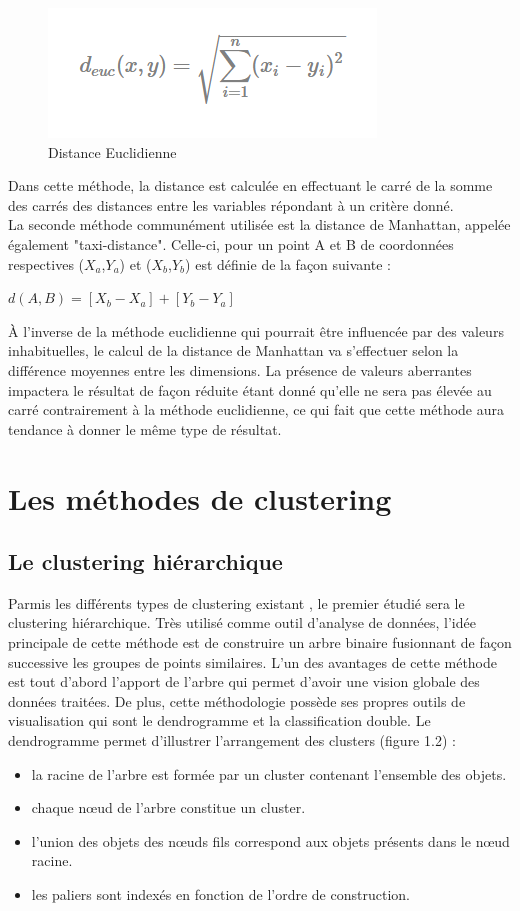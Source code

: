 \documentclass[memoire.tex]{subfiles}
\begin{document}
	\begin{figure}[h!]
		\centerline{\includegraphics[scale=0.8]{img/euclidienne_distance.png}}
		\caption{Distance Euclidienne}
	\end{figure}
Dans cette méthode, la distance est calculée en effectuant le carré de la somme des carrés des distances entre les variables répondant à un critère donné.\\
La seconde méthode communément utilisée est la distance de Manhattan, appelée également "taxi-distance". Celle-ci, pour un point A et B de coordonnées respectives ($X_{a}$,$Y_{a}$) et ($X_{b}$,$Y_{b}$) est définie de la façon  suivante :\\
\begin{center}
$d(A,B) = [X_{b} - X_{a}] + [Y_{b} - Y_{a}]$\\
\end{center}
À l'inverse de la méthode euclidienne qui pourrait être influencée par des valeurs inhabituelles, le calcul de la distance de Manhattan va s'effectuer selon la différence moyennes entre les dimensions. La présence de valeurs aberrantes impactera le résultat de façon réduite étant donné qu'elle ne sera pas élevée au carré contrairement à la méthode euclidienne, ce qui fait que cette méthode aura tendance à donner le même type de résultat.
\newpage
\section{Les méthodes de clustering}
		\subsection{Le clustering hiérarchique}
Parmis les différents types de clustering existant \cite{ref4}, le premier étudié sera le clustering hiérarchique. Très utilisé comme outil d'analyse de données, l'idée principale de cette méthode est de construire un arbre binaire fusionnant de façon successive les groupes de points similaires. L'un des avantages de cette méthode est tout d'abord l'apport de l'arbre qui permet d'avoir une vision globale des données traitées. De plus, cette méthodologie possède ses propres outils de visualisation qui sont le dendrogramme et la classification double. Le dendrogramme permet d'illustrer l'arrangement des clusters (figure 1.2)\cite{ref8} :
\begin{itemize}
\item la racine de l'arbre est formée par un cluster contenant l'ensemble des objets.
\item chaque nœud de l'arbre constitue un cluster.
\item l'union des objets des nœuds fils correspond aux objets présents dans le nœud racine.
\item les paliers sont indexés en fonction de l'ordre de construction.
\end{itemize}
\end{document}
